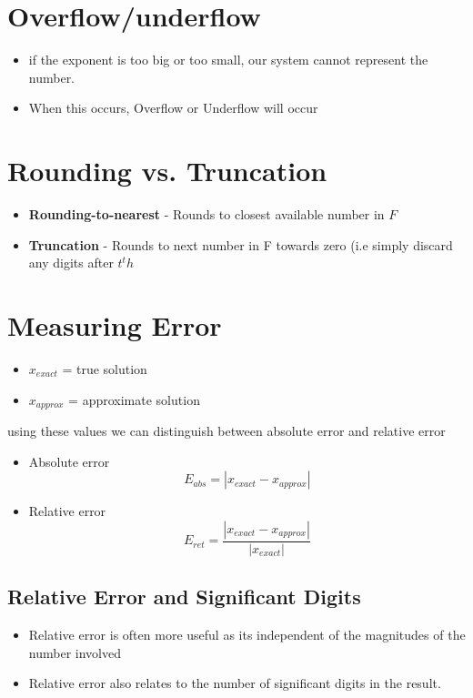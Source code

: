 \documentclass[twoside]{article}
\begin{document}
\section{Overflow/underflow}
\begin{itemize}
\item if the exponent is too big or too small, our system cannot represent the number.
\item When this occurs, Overflow or Underflow will occur 
\end{itemize}

\section{Rounding vs. Truncation}
\begin{itemize}
\item \textbf{Rounding-to-nearest} - Rounds to closest available number in \(F\)
\item \textbf{Truncation} - Rounds to next number in F towards zero (i.e simply discard any digits after \(t^th\)
\end{itemize}

\section{Measuring Error}
\begin{itemize}
\item \(x_{exact}\) = true solution
\item \(x_{approx}\) = approximate solution 
\end{itemize}

using these values we can distinguish between absolute error and relative error 
\begin{itemize}
\item Absolute error 
$$ E_{abs} = |x_{exact} - x_{approx}|$$
\item Relative error 
$$ E_{ret} = \frac{|x_{exact} - x_{approx}|}{|x_{exact}|}$$
\end{itemize} 

\subsection{Relative Error and Significant Digits}
\begin{itemize}
\item Relative error is often more useful as its independent of the magnitudes of the number involved
\item Relative error also relates to the number of significant digits in the result. 
\end{itemize}
\end{document}
